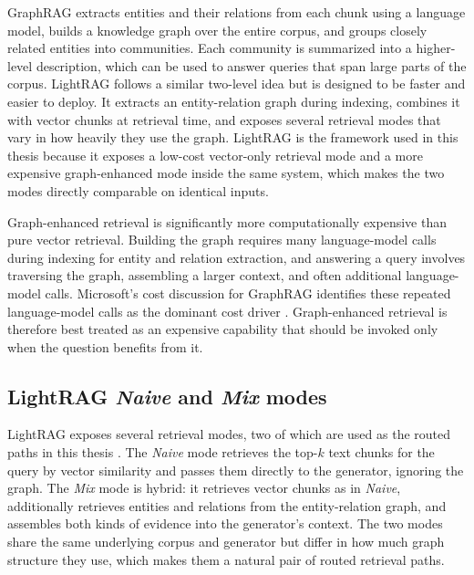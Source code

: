 \documentclass[english, bibtex]{kththesis}               %
\numberwithin{listing}{chapter}
\begin{document}
GraphRAG \cite{edge2024graphrag} extracts entities and their relations from each chunk using a language model, builds a knowledge graph over the entire corpus, and groups closely related entities into communities. Each community is summarized into a higher-level description, which can be used to answer queries that span large parts of the corpus. LightRAG \cite{lightrag2024} follows a similar two-level idea but is designed to be faster and easier to deploy. It extracts an entity-relation graph during indexing, combines it with vector chunks at retrieval time, and exposes several retrieval modes that vary in how heavily they use the graph. LightRAG is the framework used in this thesis because it exposes a low-cost vector-only retrieval mode and a more expensive graph-enhanced mode inside the same system, which makes the two modes directly comparable on identical inputs.

Graph-enhanced retrieval is significantly more computationally expensive than pure vector retrieval. Building the graph requires many language-model calls during indexing for entity and relation extraction, and answering a query involves traversing the graph, assembling a larger context, and often additional language-model calls. Microsoft's cost discussion for GraphRAG identifies these repeated language-model calls as the dominant cost driver \cite{edge2024graphrag,microsoft2024graphragcosts}. Graph-enhanced retrieval is therefore best treated as an expensive capability that should be invoked only when the question benefits from it.

\subsection{LightRAG \emph{Naive} and \emph{Mix} modes}
\label{sec:backgroundLightragModes}

LightRAG exposes several retrieval modes, two of which are used as the routed paths in this thesis \cite{lightrag2024}. The \emph{Naive} mode retrieves the top-\(k\) text chunks for the query by vector similarity and passes them directly to the generator, ignoring the graph. The \emph{Mix} mode is hybrid: it retrieves vector chunks as in \emph{Naive}, additionally retrieves entities and relations from the entity-relation graph, and assembles both kinds of evidence into the generator's context. The two modes share the same underlying corpus and generator but differ in how much graph structure they use, which makes them a natural pair of routed retrieval paths.
\end{document}
